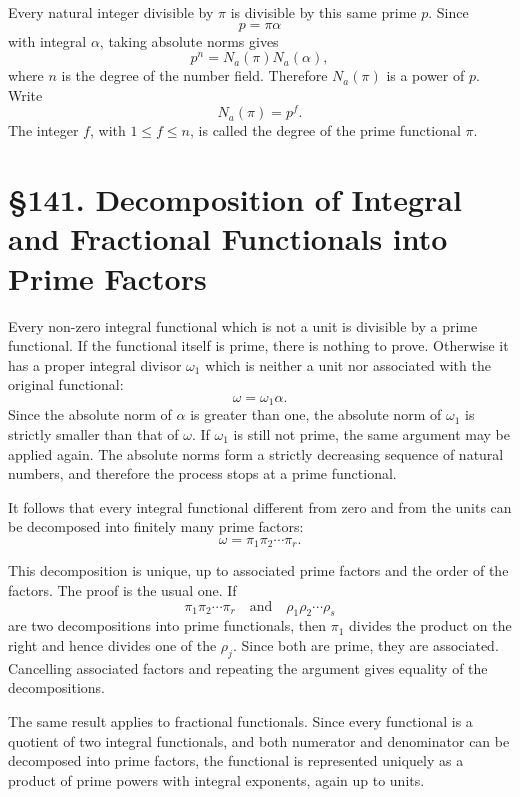 \documentclass[11pt,a4paper]{book}
\newcommand{\webersection}[2]{\clearpage\section*{\S #1. #2}}
\begin{document}
Every natural integer divisible by \(\pi\) is divisible by this same prime \(p\).  Since
\begin{equation}
 p=\pi\alpha \tag{1}
\end{equation}
with integral \(\alpha\), taking absolute norms gives
\begin{equation}
 p^n=N_a(\pi)N_a(\alpha), \tag{2}
\end{equation}
where \(n\) is the degree of the number field.  Therefore \(N_a(\pi)\) is a power of \(p\).  Write
\begin{equation}
 N_a(\pi)=p^f. \tag{3}
\end{equation}
The integer \(f\), with \(1\leq f\leq n\), is called the degree of the prime functional \(\pi\).

\webersection{141}{Decomposition of Integral and Fractional Functionals into Prime Factors}

Every non-zero integral functional which is not a unit is divisible by a prime functional.  If the functional itself is prime, there is nothing to prove.  Otherwise it has a proper integral divisor \(\omega_1\) which is neither a unit nor associated with the original functional:
\[
 \omega=
\omega_1\alpha.
\]
Since the absolute norm of \(\alpha\) is greater than one, the absolute norm of \(\omega_1\) is strictly smaller than that of \(\omega\).  If \(\omega_1\) is still not prime, the same argument may be applied again.  The absolute norms form a strictly decreasing sequence of natural numbers, and therefore the process stops at a prime functional.

It follows that every integral functional different from zero and from the units can be decomposed into finitely many prime factors:
\begin{equation}
 \omega=\pi_1\pi_2\cdots\pi_r. \tag{1}
\end{equation}

This decomposition is unique, up to associated prime factors and the order of the factors.  The proof is the usual one.  If
\[
 \pi_1\pi_2\cdots\pi_r
\quad \text{and}\quad
 \rho_1\rho_2\cdots\rho_s
\]
are two decompositions into prime functionals, then \(\pi_1\) divides the product on the right and hence divides one of the \(\rho_j\).  Since both are prime, they are associated.  Cancelling associated factors and repeating the argument gives equality of the decompositions.

The same result applies to fractional functionals.  Since every functional is a quotient of two integral functionals, and both numerator and denominator can be decomposed into prime factors, the functional is represented uniquely as a product of prime powers with integral exponents, again up to units.
\end{document}
